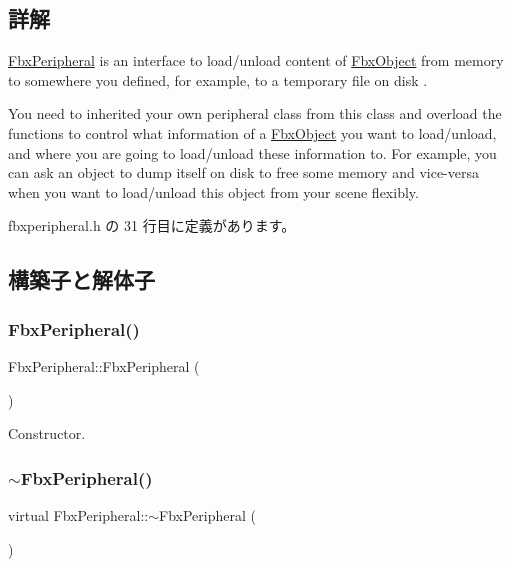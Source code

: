 \subsection{詳解}
\hyperlink{class_fbx_peripheral}{Fbx\+Peripheral} is an interface to load/unload content of \hyperlink{class_fbx_object}{Fbx\+Object} from memory to somewhere you defined, for example, to a temporary file on disk .

You need to inherited your own peripheral class from this class and overload the functions to control what information of a \hyperlink{class_fbx_object}{Fbx\+Object} you want to load/unload, and where you are going to load/unload these information to. For example, you can ask an object to dump itself on disk to free some memory and vice-\/versa when you want to load/unload this object from your scene flexibly. 

 fbxperipheral.\+h の 31 行目に定義があります。



\subsection{構築子と解体子}
\mbox{\label{class_fbx_peripheral_a46a788c258ad53fed8a716abc03d36c3}} 
\subsubsection{\texorpdfstring{Fbx\+Peripheral()}{FbxPeripheral()}}
{\footnotesize\ttfamily Fbx\+Peripheral\+::\+Fbx\+Peripheral (\begin{DoxyParamCaption}{ }\end{DoxyParamCaption})}



Constructor. 

\mbox{\label{class_fbx_peripheral_aad41e072490022edaba6f3b7e11e0b5d}} 
\subsubsection{\texorpdfstring{$\sim$\+Fbx\+Peripheral()}{~FbxPeripheral()}}
{\footnotesize\ttfamily virtual Fbx\+Peripheral\+::$\sim$\+Fbx\+Peripheral (\begin{DoxyParamCaption}{ }\end{DoxyParamCaption})\hspace{0.3cm}{\ttfamily [virtual]}}



